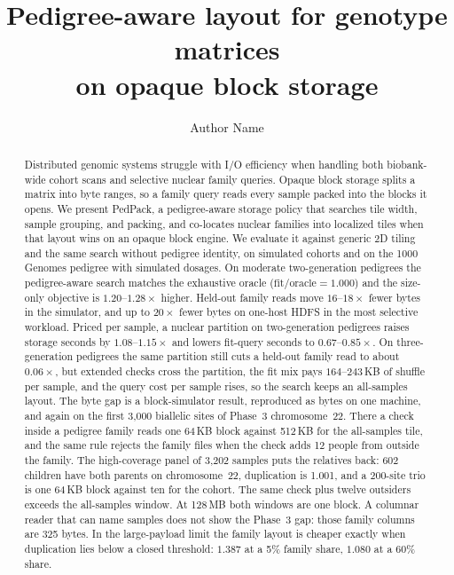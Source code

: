 \documentclass[11pt]{article}
\title{Pedigree-aware layout for genotype matrices\\
on opaque block storage}
\author{Author Name}
\date{}
\begin{document}
\maketitle

\begin{abstract}
Distributed genomic systems struggle with I/O efficiency when handling both biobank-wide cohort scans and selective nuclear family queries.
Opaque block storage splits a matrix into byte ranges, so a family query reads every sample packed into the blocks it opens.
We present PedPack, a pedigree-aware storage policy that searches tile width, sample grouping, and packing, and co-locates nuclear families into localized tiles when that layout wins on an opaque block engine.
We evaluate it against generic 2D tiling and the same search without pedigree identity, on simulated cohorts and on the 1000 Genomes pedigree with simulated dosages.
On moderate two-generation pedigrees the pedigree-aware search matches the exhaustive oracle ($\mathrm{fit}/\mathrm{oracle} = 1.000$) and the size-only objective is $1.20$--$1.28\times$ higher.
Held-out family reads move $16$--$18\times$ fewer bytes in the simulator, and up to $20\times$ fewer bytes on one-host HDFS in the most selective workload.
Priced per sample, a nuclear partition on two-generation pedigrees raises storage seconds by $1.08$--$1.15\times$ and lowers fit-query seconds to $0.67$--$0.85\times$.
On three-generation pedigrees the same partition still cuts a held-out family read to about $0.06\times$, but extended checks cross the partition, the fit mix pays $164$--$243$\,KB of shuffle per sample, and the query cost per sample rises, so the search keeps an all-samples layout.
The byte gap is a block-simulator result, reproduced as bytes on one machine, and again on the first 3{,}000 biallelic sites of Phase~3 chromosome~22.
There a check inside a pedigree family reads one 64\,KB block against 512\,KB for the all-samples tile, and the same rule rejects the family files when the check adds 12 people from outside the family.
The high-coverage panel of 3{,}202 samples puts the relatives back: 602 children have both parents on chromosome~22, duplication is 1.001, and a 200-site trio is one 64\,KB block against ten for the cohort.
The same check plus twelve outsiders exceeds the all-samples window.
At 128\,MB both windows are one block.
A columnar reader that can name samples does not show the Phase~3 gap: those family columns are 325 bytes.
In the large-payload limit the family layout is cheaper exactly when duplication lies below a closed threshold: \(1.387\) at a 5\% family share, \(1.080\) at a 60\% share.

\end{abstract}
\end{document}
